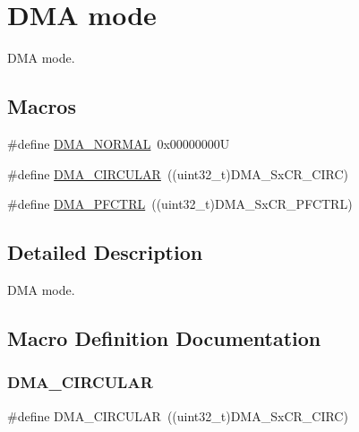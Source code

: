 \hypertarget{group___d_m_a__mode}{}\section{D\+MA mode}
\label{group___d_m_a__mode}


D\+MA mode.  


\subsection*{Macros}
\begin{DoxyCompactItemize}
\item 
\#define \mbox{\hyperlink{group___d_m_a__mode_ga04941acfbbdefc53e1e08133cffa3b8a}{D\+M\+A\+\_\+\+N\+O\+R\+M\+AL}}~0x00000000U
\item 
\#define \mbox{\hyperlink{group___d_m_a__mode_ga4c4f425cba13edffb3c831c036c91e01}{D\+M\+A\+\_\+\+C\+I\+R\+C\+U\+L\+AR}}~((uint32\+\_\+t)D\+M\+A\+\_\+\+Sx\+C\+R\+\_\+\+C\+I\+RC)
\item 
\#define \mbox{\hyperlink{group___d_m_a__mode_ga7974ee645c8e275a2297cf37eec9e022}{D\+M\+A\+\_\+\+P\+F\+C\+T\+RL}}~((uint32\+\_\+t)D\+M\+A\+\_\+\+Sx\+C\+R\+\_\+\+P\+F\+C\+T\+RL)
\end{DoxyCompactItemize}


\subsection{Detailed Description}
D\+MA mode. 



\subsection{Macro Definition Documentation}
\mbox{\label{group___d_m_a__mode_ga4c4f425cba13edffb3c831c036c91e01}} 
\subsubsection{\texorpdfstring{D\+M\+A\+\_\+\+C\+I\+R\+C\+U\+L\+AR}{DMA\_CIRCULAR}}
{\footnotesize\ttfamily \#define D\+M\+A\+\_\+\+C\+I\+R\+C\+U\+L\+AR~((uint32\+\_\+t)D\+M\+A\+\_\+\+Sx\+C\+R\+\_\+\+C\+I\+RC)}

